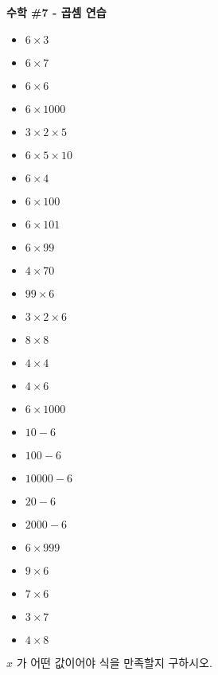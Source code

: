 \documentclass[a4paper,15pt]{exam}
\begin{document}
\fontsize{13pt}{24pt}\selectfont

\begin{center}
  \bfseries\LARGE
  수학 \#7 - 곱셈 연습
  \bigskip
  \normalfont\normalsize
\end{center}

\begin{multicols}{2}
\begin{itemize}

\item $ 6 \times 3 $ 
\item $ 6 \times 7 $ 
\item $ 6 \times 6 $ 
\item $ 6 \times 1000 $ 
\item $ 3 \times 2 \times 5$ 
\item $ 6 \times 5 \times 10$
\item $ 6 \times 4 $ 
\item $ 6 \times 100 $
\item $ 6 \times 101 $
\item $ 6 \times 99 $
\item $ 4 \times 70 $
\item $ 99 \times 6 $
\item $ 3 \times 2 \times 6 $
\item $ 8 \times 8 $
\item $ 4 \times 4 $
\item $ 4 \times 6 $
\item $ 6 \times 1000 $
\item $ 10 - 6 $
\item $ 100 - 6 $
\item $ 10000 - 6 $
\item $ 20 - 6 $
\item $ 2000 - 6 $
\item $ 6 \times 999 $
\item $ 9 \times 6 $
\item $ 7 \times 6 $
\item $ 3 \times 7 $
\item $ 4 \times 8 $

\end{itemize}
\end{multicols}

$x$ 가 어떤 값이어야 식을 만족할지 구하시오.
\end{document}
